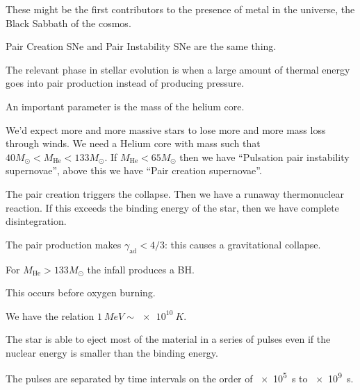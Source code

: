 \documentclass[main.tex]{subfiles}
\begin{document}
These might be the first contributors to the presence of metal in the universe, the Black Sabbath of the cosmos. 

Pair Creation SNe and Pair Instability SNe are the same thing. 

The relevant phase in stellar evolution is when a large amount of thermal energy goes into pair production instead of producing pressure. 

An important parameter is the mass of the helium core. 

We'd expect more and more massive stars to lose more and more mass loss through winds. 
We need a Helium core with mass such that \(40 M_{\odot} < M _{\text{He}} < 133 M_{\odot}\). If \(M _{\text{He}} < 65 M_{\odot}\) then we have ``Pulsation pair instability supernovae'', above this we have ``Pair creation supernovae''. 

The pair creation triggers the collapse. Then we have a runaway thermonuclear reaction. If this exceeds the binding energy of the star, then we have complete disintegration. 


The pair production makes \(\gamma _{\text{ad}} < 4/3\): this causes a gravitational collapse. 

For \(M _{\text{He}} > 133 M_{\odot}\) the infall produces a BH.

This occurs before oxygen burning. 

We have the relation \(\SI{1}{MeV} \sim \SI{e10}{K}\). 

The star is able to eject most of the material in a series of pulses even if the nuclear energy is smaller than the binding energy. 

The pulses are separated by time intervals on the order of \SI{e5}{s} to \SI{e9}{s}.  
\end{document}
